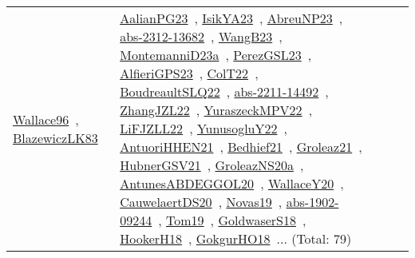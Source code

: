 {\begin{longtable}{lp{3cm}>{\raggedright\arraybackslash}p{6cm}>{\raggedright\arraybackslash}p{6cm}>{\raggedright\arraybackslash}p{8cm}}
\href{works/Wallace96.pdf}{Wallace96}~\cite{Wallace96}, \href{works/BlazewiczLK83.pdf}{BlazewiczLK83}~\cite{BlazewiczLK83} & \href{works/AalianPG23.pdf}{AalianPG23}~\cite{AalianPG23}, \href{works/IsikYA23.pdf}{IsikYA23}~\cite{IsikYA23}, \href{works/AbreuNP23.pdf}{AbreuNP23}~\cite{AbreuNP23}, \href{works/abs-2312-13682.pdf}{abs-2312-13682}~\cite{abs-2312-13682}, \href{works/WangB23.pdf}{WangB23}~\cite{WangB23}, \href{works/MontemanniD23a.pdf}{MontemanniD23a}~\cite{MontemanniD23a}, \href{works/PerezGSL23.pdf}{PerezGSL23}~\cite{PerezGSL23}, \href{works/AlfieriGPS23.pdf}{AlfieriGPS23}~\cite{AlfieriGPS23}, \href{works/ColT22.pdf}{ColT22}~\cite{ColT22}, \href{works/BoudreaultSLQ22.pdf}{BoudreaultSLQ22}~\cite{BoudreaultSLQ22}, \href{works/abs-2211-14492.pdf}{abs-2211-14492}~\cite{abs-2211-14492}, \href{works/ZhangJZL22.pdf}{ZhangJZL22}~\cite{ZhangJZL22}, \href{works/YuraszeckMPV22.pdf}{YuraszeckMPV22}~\cite{YuraszeckMPV22}, \href{works/LiFJZLL22.pdf}{LiFJZLL22}~\cite{LiFJZLL22}, \href{works/YunusogluY22.pdf}{YunusogluY22}~\cite{YunusogluY22}, \href{works/AntuoriHHEN21.pdf}{AntuoriHHEN21}~\cite{AntuoriHHEN21}, \href{works/Bedhief21.pdf}{Bedhief21}~\cite{Bedhief21}, \href{works/Groleaz21.pdf}{Groleaz21}~\cite{Groleaz21}, \href{works/HubnerGSV21.pdf}{HubnerGSV21}~\cite{HubnerGSV21}, \href{works/GroleazNS20a.pdf}{GroleazNS20a}~\cite{GroleazNS20a}, \href{works/AntunesABDEGGOL20.pdf}{AntunesABDEGGOL20}~\cite{AntunesABDEGGOL20}, \href{works/WallaceY20.pdf}{WallaceY20}~\cite{WallaceY20}, \href{works/CauwelaertDS20.pdf}{CauwelaertDS20}~\cite{CauwelaertDS20}, \href{works/Novas19.pdf}{Novas19}~\cite{Novas19}, \href{works/abs-1902-09244.pdf}{abs-1902-09244}~\cite{abs-1902-09244}, \href{works/Tom19.pdf}{Tom19}~\cite{Tom19}, \href{works/GoldwaserS18.pdf}{GoldwaserS18}~\cite{GoldwaserS18}, \href{works/HookerH18.pdf}{HookerH18}~\cite{HookerH18}, \href{works/GokgurHO18.pdf}{GokgurHO18}~\cite{GokgurHO18}... (Total: 79)\\
\end{longtable}
}

